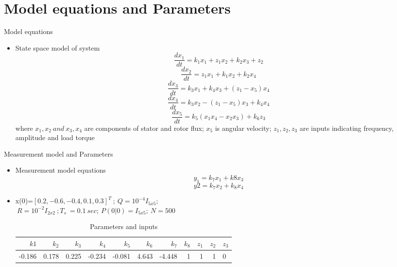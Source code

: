 \documentclass{beamer}
\begin{document}
\section{Model equations and Parameters}
\begin{frame}{Model equations}
\begin{itemize}
    \item State space model of system
    \begin{equation}
        \frac{dx_1}{dt}=k_1x_1 + z_1x_2+k_2x_3+z_2
    \end{equation}
    \begin{equation}
        \frac{dx_2}{dt}=z_1x_1 +k_1x_2+k_2x_4
    \end{equation}
    \begin{equation}
        \frac{dx_3}{dt}=k_3x_1+k_4x_3+(z_1-x_5)x_4
    \end{equation}
    \begin{equation}
        \frac{dx_4}{dt}=k_3x_2-(z_1-x_5)x_3+k_4x_4
    \end{equation}
    \begin{equation}
        \frac{dx_5}{dt}=k_5(x_1x_4-x_2x_3)+k_6z_3
    \end{equation}
    where $x_1,x_2 \ and \ x_3,x_4$ are components of stator and rotor flux; $x_5$ is angular velocity; $z_1,z_2,z_3$ are inputs indicating frequency, amplitude and load torque
\end{itemize} 
\end{frame}
\begin{frame}{Measurement model and Parameters}
\begin{itemize}
    \item Measurement model equations
    \begin{equation}
        y_1=k_7x_1+k8x_3
    \end{equation}
    \begin{equation}
        y2=k_7x_2+k_8x_4
    \end{equation}
    \item x(0)=$[0.2,-0.6,-0.4,0.1,0.3]^T\ ;\ Q=10^{-4}I_{5x5};$\\
    $\ R=10^{-2}I_{2x2}\ ; T_s\ =0.1\ sec; \ P(0|0)=I_{5x5};\ N=500$
    \begin{table}[h!]
    \tiny
  \begin{center}
    \caption{Parameters and inputs}
    \label{tab:table1}
    \begin{tabular}{r|r|r|r|r|r|r|r|r|r|l} %
      $k1$ & $k_2$ & $k_3$ & $k_4$ & $k_5$ & $k_6$ & $k_7$ & $k_8$ &$z_1$ & $z_2$ & $z_3$ \\
      \hline
      -0.186 & 0.178 & 0.225 & -0.234 & -0.081&4.643& -4.448 & 1& 1&1 & 0
    \end{tabular}
  \end{center}
\end{table}
    
    
\end{itemize}
    
\end{frame}
\end{document}
